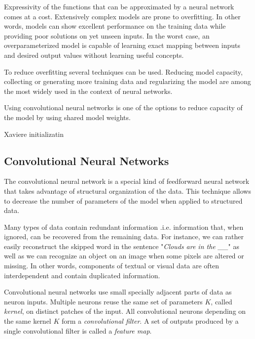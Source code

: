 Expressivity of the functions that can be approximated by a neural network comes at a cost.
Extensively complex models are prone to overfitting. In other words, models can show excellent performance on the training data while providing poor solutions on yet unseen inputs. In the worst case, an overparameterized model is capable of learning exact mapping between inputs and desired output values without learning useful concepts.

To reduce overfitting several techniques can be used. Reducing model capacity, collecting or generating more training data and regularizing the model are among the most widely used in the context of neural networks.

Using convolutional neural networks is one of the options to reduce capacity of the model by using shared model weights.

Xaviere initializatin \cite{Glorot2010}



\subsection{Convolutional Neural Networks}
\label{ch:cnn}

The convolutional neural network is a special kind of feedforward neural network that takes advantage of structural organization of the data. This technique allows to decrease the number of parameters of the model when applied to structured data.

Many types of data contain redundant information .i.e. information that, when ignored, can be recovered from the remaining data.
For instance, we can rather easily reconstruct the skipped word in the sentence "\textit{Clouds are in the \_\_}" as well as we can recognize an object on an image when some pixels are altered or missing.
In other words, components of textual or visual data are often interdependent and contain duplicated information.

Convolutional neural networks use small specially adjacent parts of data as neuron inputs. Multiple neurons reuse the same set of parameters $K$, called \textit{kernel}, on distinct patches of the input. All convolutional neurons depending on the same kernel $K$ form a \textit{convolutional filter}. A set of outputs produced by a single convolutional filter is called a \textit{feature map}.



